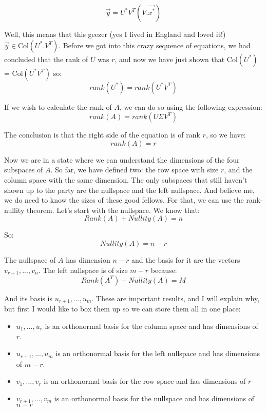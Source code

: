 \documentclass[a4,12pt,twosided,openany]{memoir}
\begin{document}
\[\overrightarrow{y} = U^*V^T\left(V.\overrightarrow{x^*} \right) \]
\par 
\indent
Well, this means that this geezer (yes I lived in England and loved it!) $\overrightarrow{y} \in \textrm{Col} \left(U^*.V^T \right) $. Before we got into this crazy sequence of equations, we had concluded that the rank of $U$ was $r$, and now we have just shown that $\textrm{Col}\left(U^*\right)$ =  $\textrm{Col}\left(U^*V^T\right)$ so:
\[rank(U^*) = rank(U^*V^T)\]
\par 
\indent
If we wish to calculate the rank of $A$, we can do so using the following expression:
\[rank(A) = rank\left(U \Sigma V^T \right)\]
\par 
\indent
The conclusion is that the right side of the equation is of rank $r$, so we have:
\[rank(A) = r\]
\par 
\indent
Now we are in a state where we can understand the dimensions of the four subspaces of $A$. So far, we have defined two: the row space with size $r$, and the column space with the same dimension. The only subspaces that still haven’t shown up to the party are the nullspace and the left nullspace. And believe me, we do need to know the sizes of these good fellows. For that, we can use the rank-nullity theorem. Let’s start with the nullspace. We know that:
\[Rank(A) + Nullity(A) = n \]
\par 
\indent
So:
\[Nullity(A) = n - r\]
\par 
\indent
The nullspace of $A$ has dimension $n−r$ and the basis for it are the vectors $v_{r+1},...,v_{n}$. The left nullspace is of size $m−r$ because:
\[Rank(A^T) + Nullity(A) = M \]
\par 
\indent
And its basis is $u_{r+1},...,u_m$. These are important results, and I will explain why, but first I would like to box them up so we can store them all in one place:
\par 
\indent
\begin{tcolorbox}
\begin{itemize}
\item $u_1,...,u_r$ is an orthonormal basis for the column space and has dimensions of $r$.
\item $u_{r+1},...,u_m$ is an orthonormal basis for the left nullspace and has dimensions of $m-r$.
\item $v_1,...,v_r$ is an orthonormal basis for the row space and has dimensions of $r$
\item $v_{r+1},...,v_m$ is an orthonormal basis for the  nullspace and has dimensions of $n-r$
\end{itemize}
\end{tcolorbox}
\end{document}

